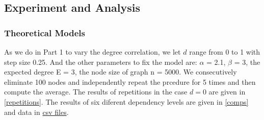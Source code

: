 \documentclass{article}
\begin{document}
\subsection{Experiment and Analysis}

\subsubsection{Theoretical Models}

\par As we do in Part 1 to vary the degree correlation, we let $d$ range from 0 to 1 with step size 0.25. And the other parameters to fix the model are: $\alpha$ = 2.1, $\beta$ = 3, the expected degree E = 3, the node size of graph n = 5000. We consecutively eliminate 100 nodes and independently repeat the prcedure for 5 times and then compute the average. The results of repetitions in the case $d=0$  are given in \ref{repetitions}. The results of six diferent dependency levels are given in \ref{comps} and data in \href{https://github.com/leahwu/DCM_simulaiton_and_analysis/tree/master/output_data/models2_ASPL_analysis}{csv files}.
\end{document}
